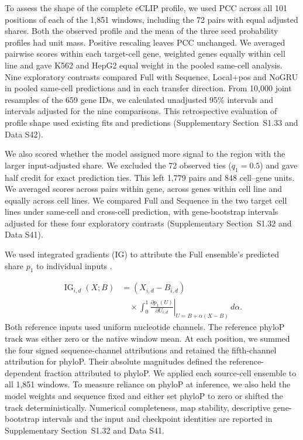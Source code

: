 \documentclass[webpdf,contemporary,large]{current_assets/oup-authoring-template}
\newcommand{\supsect}[1]{Supplementary Section~#1}
\begin{document}
To assess the shape of the complete eCLIP profile, we used PCC across all 101 positions of each of the 1,851 windows, including the 72 pairs with equal adjusted shares. Both the observed profile and the mean of the three seed probability profiles had unit mass. Positive rescaling leaves PCC unchanged. We averaged pairwise scores within each target-cell gene, weighted genes equally within cell line and gave K562 and HepG2 equal weight in the pooled same-cell analysis. Nine exploratory contrasts compared Full with Sequence, Local+pos and NoGRU in pooled same-cell predictions and in each transfer direction. From 10,000 joint resamples of the 659 gene IDs, we calculated unadjusted 95\% intervals and intervals adjusted for the nine comparisons. This retrospective evaluation of profile shape used existing fits and predictions (\supsect{S1.33} and Data S42).

We also scored whether the model assigned more signal to the region with the larger input-adjusted share. We excluded the 72 observed ties ($q_1=0.5$) and gave half credit for exact prediction ties. This left 1,779 pairs and 848 cell--gene units. We averaged scores across pairs within gene, across genes within cell line and equally across cell lines. We compared Full and Sequence in the two target cell lines under same-cell and cross-cell prediction, with gene-bootstrap intervals adjusted for these four exploratory contrasts (\supsect{S1.32} and Data S41).

We used integrated gradients (IG) to attribute the Full ensemble's predicted share $p_1$ to individual inputs \citep{sundararajan2017integrated}.

\begin{equation}
\begin{aligned}
\operatorname{IG}_{i,d}(X;B)
&=(X_{i,d}-B_{i,d})\\[-2pt]
&\quad\times\int_0^1
\left.\frac{\partial p_1(U)}{\partial U_{i,d}}\right|_{U=B+\alpha(X-B)}\,d\alpha .
\end{aligned}
\label{eq:context_ig}
\end{equation}
Both reference inputs used uniform nucleotide channels. The reference phyloP track was either zero or the native window mean. At each position, we summed the four signed sequence-channel attributions and retained the fifth-channel attribution for phyloP. Their absolute magnitudes defined the reference-dependent fraction attributed to phyloP. We applied each source-cell ensemble to all 1,851 windows. To measure reliance on phyloP at inference, we also held the model weights and sequence fixed and either set phyloP to zero or shifted the track deterministically. Numerical completeness, map stability, descriptive gene-bootstrap intervals and the input and checkpoint identities are reported in \supsect{S1.32} and Data S41.
\end{document}
